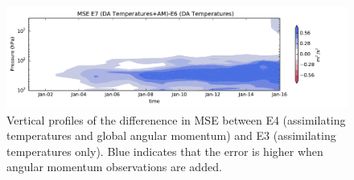  \begin{figure}
	 \includegraphics[width=\textwidth]{Paper_figures/ERPDA_paper_MSE_RST_vs_ERPRST.pdf}
	 \caption{Vertical profiles of the differenence in MSE between E4 (assimilating temperatures and global angular momentum) and E3 (assimilating temperatures only). Blue indicates that the error is higher when angular momentum observations are added.}
	 \label{fig:added_value_MSE}
\end{figure}

